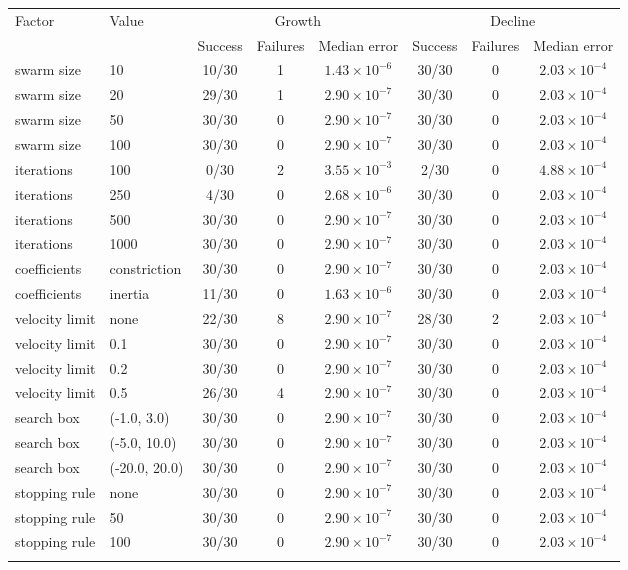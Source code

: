 \begin{tabular}{llcccccc}
\toprule
Factor & Value & \multicolumn{3}{c}{Growth} & \multicolumn{3}{c}{Decline}\\
\cmidrule(lr){3-5}\cmidrule(lr){6-8}
 & & Success & Failures & Median error & Success & Failures & Median error\\
\midrule
swarm size & 10 & 10/30 & 1 & $1.43\times10^{-6}$ & 30/30 & 0 & $2.03\times10^{-4}$\\
swarm size & 20 & 29/30 & 1 & $2.90\times10^{-7}$ & 30/30 & 0 & $2.03\times10^{-4}$\\
swarm size & 50 & 30/30 & 0 & $2.90\times10^{-7}$ & 30/30 & 0 & $2.03\times10^{-4}$\\
swarm size & 100 & 30/30 & 0 & $2.90\times10^{-7}$ & 30/30 & 0 & $2.03\times10^{-4}$\\
\addlinespace
iterations & 100 & 0/30 & 2 & $3.55\times10^{-3}$ & 2/30 & 0 & $4.88\times10^{-4}$\\
iterations & 250 & 4/30 & 0 & $2.68\times10^{-6}$ & 30/30 & 0 & $2.03\times10^{-4}$\\
iterations & 500 & 30/30 & 0 & $2.90\times10^{-7}$ & 30/30 & 0 & $2.03\times10^{-4}$\\
iterations & 1000 & 30/30 & 0 & $2.90\times10^{-7}$ & 30/30 & 0 & $2.03\times10^{-4}$\\
\addlinespace
coefficients & constriction & 30/30 & 0 & $2.90\times10^{-7}$ & 30/30 & 0 & $2.03\times10^{-4}$\\
coefficients & inertia & 11/30 & 0 & $1.63\times10^{-6}$ & 30/30 & 0 & $2.03\times10^{-4}$\\
\addlinespace
velocity limit & none & 22/30 & 8 & $2.90\times10^{-7}$ & 28/30 & 2 & $2.03\times10^{-4}$\\
velocity limit & 0.1 & 30/30 & 0 & $2.90\times10^{-7}$ & 30/30 & 0 & $2.03\times10^{-4}$\\
velocity limit & 0.2 & 30/30 & 0 & $2.90\times10^{-7}$ & 30/30 & 0 & $2.03\times10^{-4}$\\
velocity limit & 0.5 & 26/30 & 4 & $2.90\times10^{-7}$ & 30/30 & 0 & $2.03\times10^{-4}$\\
\addlinespace
search box & (-1.0, 3.0) & 30/30 & 0 & $2.90\times10^{-7}$ & 30/30 & 0 & $2.03\times10^{-4}$\\
search box & (-5.0, 10.0) & 30/30 & 0 & $2.90\times10^{-7}$ & 30/30 & 0 & $2.03\times10^{-4}$\\
search box & (-20.0, 20.0) & 30/30 & 0 & $2.90\times10^{-7}$ & 30/30 & 0 & $2.03\times10^{-4}$\\
\addlinespace
stopping rule & none & 30/30 & 0 & $2.90\times10^{-7}$ & 30/30 & 0 & $2.03\times10^{-4}$\\
stopping rule & 50 & 30/30 & 0 & $2.90\times10^{-7}$ & 30/30 & 0 & $2.03\times10^{-4}$\\
stopping rule & 100 & 30/30 & 0 & $2.90\times10^{-7}$ & 30/30 & 0 & $2.03\times10^{-4}$\\
\addlinespace
\bottomrule
\end{tabular}
